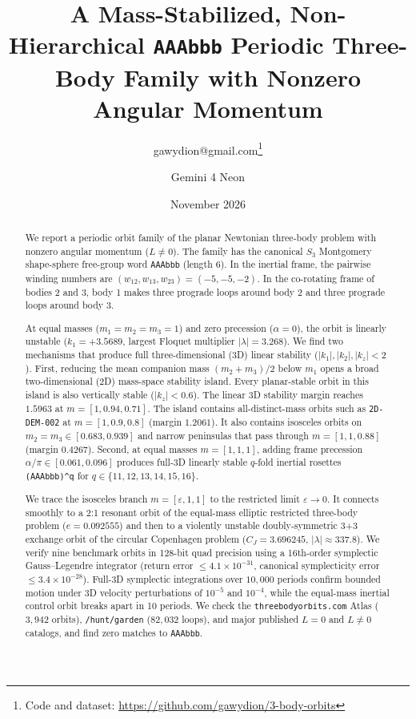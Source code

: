 \documentclass[11pt,a4paper]{article}
\title{A Mass-Stabilized, Non-Hierarchical \texttt{AAAbbb} Periodic Three-Body Family with Nonzero Angular Momentum}
\author{gawydion@gmail.com\thanks{Code and dataset: \url{https://github.com/gawydion/3-body-orbits}} \and Gemini 4 Neon}
\date{November 2026}
\begin{document}
\maketitle

\begin{abstract}
We report a periodic orbit family of the planar Newtonian three-body problem with nonzero angular momentum ($L \neq 0$).
The family has the canonical $S_3$ Montgomery shape-sphere free-group word \texttt{AAAbbb} (length 6).
In the inertial frame, the pairwise winding numbers are $(w_{12}, w_{13}, w_{23}) = (-5, -5, -2)$.
In the co-rotating frame of bodies 2 and 3, body 1 makes three prograde loops around body 2 and three prograde loops around body 3.

At equal masses ($m_1 = m_2 = m_3 = 1$) and zero precession ($\alpha = 0$), the orbit is linearly unstable ($k_1 = +3.5689$, largest Floquet multiplier $|\lambda| = 3.268$).
We find two mechanisms that produce full three-dimensional (3D) linear stability ($|k_1|, |k_2|, |k_z| < 2$).
First, reducing the mean companion mass $(m_2 + m_3)/2$ below $m_1$ opens a broad two-dimensional (2D) mass-space stability island.
Every planar-stable orbit in this island is also vertically stable ($|k_z| < 0.6$).
The linear 3D stability margin reaches $1.5963$ at $m = [1, 0.94, 0.71]$.
The island contains all-distinct-mass orbits such as \texttt{2D-DEM-002} at $m = [1, 0.9, 0.8]$ (margin $1.2061$).
It also contains isosceles orbits on $m_2 = m_3 \in [0.683, 0.939]$ and narrow peninsulas that pass through $m = [1, 1, 0.88]$ (margin $0.4267$).
Second, at equal masses $m = [1, 1, 1]$, adding frame precession $\alpha/\pi \in [0.061, 0.096]$ produces full-3D linearly stable $q$-fold inertial rosettes \texttt{(AAAbbb)\^{}q} for $q \in \{11, 12, 13, 14, 15, 16\}$.

We trace the isosceles branch $m = [\varepsilon, 1, 1]$ to the restricted limit $\varepsilon \to 0$.
It connects smoothly to a 2:1 resonant orbit of the equal-mass elliptic restricted three-body problem ($e = 0.092555$) and then to a violently unstable doubly-symmetric 3+3 exchange orbit of the circular Copenhagen problem ($C_J = 3.696245$, $|\lambda| \approx 337.8$).
We verify nine benchmark orbits in 128-bit quad precision using a 16th-order symplectic Gauss--Legendre integrator (return error $\le 4.1 \times 10^{-31}$, canonical symplecticity error $\le 3.4 \times 10^{-28}$).
Full-3D symplectic integrations over $10{,}000$ periods confirm bounded motion under 3D velocity perturbations of $10^{-5}$ and $10^{-4}$, while the equal-mass inertial control orbit breaks apart in 10 periods.
We check the \texttt{threebodyorbits.com} Atlas ($3{,}942$ orbits), \texttt{/hunt/garden} ($82{,}032$ loops), and major published $L = 0$ and $L \neq 0$ catalogs, and find zero matches to \texttt{AAAbbb}.
\end{abstract}
\end{document}

